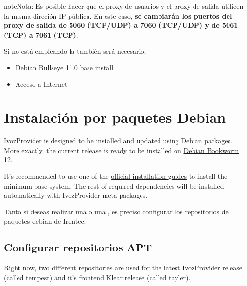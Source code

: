 \documentclass[letterpaper,10pt,spanish]{sphinxmanual}
\begin{document}
\begin{notice}{note}{Nota:}
Es posible hacer que el proxy de usuarios y el proxy de salida utilicen la misma direción IP pública. En este caso, \textbf{se cambiarán los puertos del proxy de salida de 5060 (TCP/UDP) a 7060 (TCP/UDP) y de 5061 (TCP) a 7061 (TCP)}.
\end{notice}

Si no está empleando la {\hyperref[basic_concepts/installation/cd_install:cds\string-automaticos\string-de\string-instalacion]{}} también será necesario:
\begin{itemize}
\item {} 
Debian Bullseye 11.0 base install

\item {} 
Acceso a Internet

\end{itemize}


\section{Instalación por paquetes Debian}
\label{basic_concepts/installation/debian_install::doc}\label{basic_concepts/installation/debian_install:debian-packages-install}
IvozProvider is designed to be installed and updated using Debian packages.
More exactly, the current release is ready to be installed on
\href{https://www.debian.org/releases/bookworm}{Debian Bookworm 12}.

It's recommended to use one of the \href{https://www.debian.org/releases/bookworm/installmanual}{official installation guides} to install the minimum
base system. The rest of required  dependencies will be installed automatically
with IvozProvider meta packages.

Tanto si deseas realizar una {\hyperref[basic_concepts/installation/install_types:instalacion\string-standalone]{}} o una {\hyperref[basic_concepts/installation/install_types:instalacion\string-distribuida]{}}, es preciso configurar los repositorios de paquetes debian de Irontec.


\subsection{Configurar repositorios APT}
\label{basic_concepts/installation/debian_install:apt-repository-configuration}
Right now, two different repositories are used for the latest IvozProvider
release (called tempest) and it's frontend Klear release (called tayler).
\end{document}
